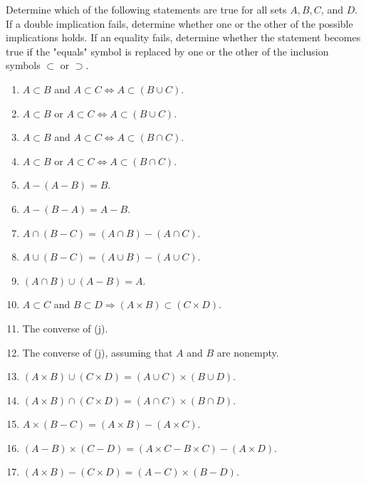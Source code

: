 \documentclass[../../master.tex]{subfiles}
\begin{document}
\begin{exercise}
    Determine which of the following statements are true for all sets $A, B, C$, and $D$.
    If a double implication fails, determine whether one or the other of the possible implications holds.
    If an equality fails, determine whether the statement becomes true if the "equals" symbol is replaced by one or the other of the inclusion symbols $\subset$ or $\supset$.
    \begin{enumerate}[label=(\alph*)]
        \item $A \subset B$ and $A \subset C \Leftrightarrow A \subset (B \cup C)$.
        \item $A \subset B$ or $A \subset C \Leftrightarrow A \subset (B \cup C)$.
        \item $A \subset B$ and $A \subset C \Leftrightarrow A \subset (B \cap C)$.
        \item $A \subset B$ or $A \subset C \Leftrightarrow A \subset (B \cap C)$.
        \item $A - (A - B) = B$.
        \item $A - (B - A) = A - B$.
        \item $A \cap (B - C) = (A \cap B) - (A \cap C)$.
        \item $A \cup (B - C) = (A \cup B) - (A \cup C)$.
        \item $(A \cap B) \cup (A - B) = A$.
        \item $A \subset C$ and $B \subset D \Rightarrow (A \times B) \subset (C \times D)$.
        \item The converse of (j).
        \item The converse of (j), assuming that $A$ and $B$ are nonempty.
        \item $(A \times B) \cup (C \times D) = (A \cup C) \times (B \cup D)$.
        \item $(A \times B) \cap (C \times D) = (A \cap C) \times (B \cap D)$.
        \item $A \times (B - C) = (A \times B) - (A \times C)$.
        \item $(A - B) \times (C - D) = (A \times C - B \times C) - (A \times D)$.
        \item $(A \times B) - (C \times D) = (A - C) \times (B - D)$.
    \end{enumerate}
\end{exercise}
\end{document}

